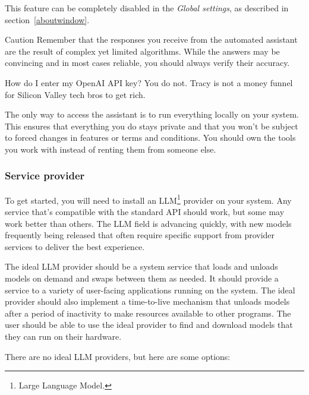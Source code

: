 \documentclass[hidelinks,titlepage,a4paper,twoside]{article}
\begin{document}
This feature can be completely disabled in the \emph{Global settings}, as described in section~\ref{aboutwindow}.

\begin{bclogo}[
noborder=true,
couleur=black!5,
logo=\bcattention
]{Caution}
Remember that the responses you receive from the automated assistant are the result of complex yet limited algorithms. While the answers may be convincing and in most cases reliable, you should always verify their accuracy.
\end{bclogo}

\begin{bclogo}[
noborder=true,
couleur=black!5,
logo=\bcquestion
]{How do I enter my OpenAI API key?}
You do not. Tracy is not a money funnel for Silicon Valley tech bros to get rich.

The only way to access the assistant is to run everything locally on your system. This ensures that everything you do stays private and that you won't be subject to forced changes in features or terms and conditions. You should own the tools you work with instead of renting them from someone else.
\end{bclogo}

\subsubsection{Service provider}

To get started, you will need to install an LLM\footnote{Large Language Model.} provider on your system. Any service that's compatible with the standard API should work, but some may work better than others. The LLM field is advancing quickly, with new models frequently being released that often require specific support from provider services to deliver the best experience.

The ideal LLM provider should be a system service that loads and unloads models on demand and swaps between them as needed. It should provide a service to a variety of user-facing applications running on the system. The ideal provider should also implement a time-to-live mechanism that unloads models after a period of inactivity to make resources available to other programs. The user should be able to use the ideal provider to find and download models that they can run on their hardware.

There are no ideal LLM providers, but here are some options:
\end{document}
